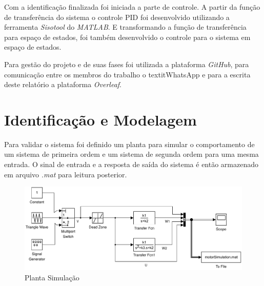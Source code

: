 \documentclass[a4paper,11pt]{article}
\begin{document}
Com a identificação finalizada foi iniciada a parte de controle. A partir da função de transferência do sistema o controle PID foi desenvolvido utilizando a ferramenta \textit{Sisotool} do \textit{MATLAB}. E transformando a função de transferência para espaço de estados, foi também desenvolvido o controle para o sistema em espaço de estados.

Para gestão do projeto e de suas fases foi utilizada a plataforma \textit{GitHub}, para comunicação entre os membros do trabalho o textit{WhatsApp} e para a escrita deste relatório a plataforma \textit{Overleaf}. 



\section{Identificação e Modelagem}


Para validar o sistema foi definido um planta para simular o comportamento de um sistema de primeira ordem e um sistema de segunda ordem para uma mesma entrada. O sinal de entrada e a resposta de saída do sistema é então armazenado em arquivo \textit{.mat} para leitura posterior.

\begin{figure}[H]
    \centering
    \includegraphics[width=1.0\linewidth]{tex/img/dcMotorSimulation.pdf}
    \caption{Planta Simulação}
    \label{fig:my_label}
\end{figure}
\end{document}
